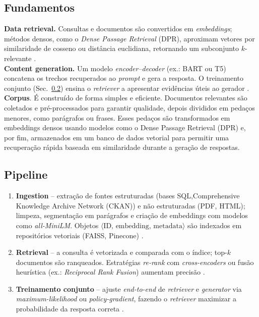 \begin{description}
\subsection{Fundamentos}
\textbf{Data retrieval.} Consultas e documentos são convertidos em
\emph{embeddings}; métodos densos, como o \textit{Dense Passage Retrieval}
(DPR), aproximam vetores por similaridade de cosseno ou distância euclidiana,
retornando um subconjunto $k$-relevante
\cite{lewis2020rag,taipalus2024vector,mageirakos2025cracking}.\\
\textbf{Content generation.} Um modelo \emph{encoder--decoder} (ex.: BART ou
T5) concatena os trechos recuperados ao \textit{prompt} e gera a resposta. O
treinamento conjunto (Sec.~\ref{sec:rag:pipeline}) ensina o \textit{retriever}
a apresentar evidências úteis ao gerador
\cite{aquino2024extracting,belarmino2025aplicacao}.\\
\textbf{Corpus}. É construído de forma simples e eficiente. Documentos relevantes são coletados e pré-processados para garantir qualidade, depois divididos em pedaços menores, como parágrafos ou frases. Esses pedaços são transformados em embeddings densos usando modelos como o Dense Passage Retrieval (DPR) e, por fim, armazenados em um banco de dados vetorial para permitir uma recuperação rápida baseada em similaridade durante a geração de respostas\cite{corpusRAG, lewis2020rag}.

 

\subsection{Pipeline}
\label{sec:rag:pipeline}
\begin{enumerate}[label=\arabic*.]
  \item \textbf{Ingestion} – extração de fontes estruturadas (bases SQL,Comprehensive Knowledge Archive Network (CKAN))
        e não estruturadas (PDF, HTML); limpeza, segmentação em parágrafos e
        criação de embeddings com modelos como \textit{all-MiniLM}.
        Objetos $\langle\text{ID},\,\text{embedding},\,\text{metadata}\rangle$
        são indexados em repositórios vetoriais (FAISS, Pinecone)
        \cite{qwak2024integrating,taipalus2024vector}.
  \item \textbf{Retrieval} – a consulta é vetorizada e comparada com o índice;
        top-$k$ documentos são ranqueados. Estratégias \emph{re-rank} com
        \textit{cross-encoders} ou fusão heurística (ex.: \textit{Reciprocal
        Rank Fusion}) aumentam precisão \cite{edwards2024hybrid}.
  \item \textbf{Treinamento conjunto} – ajuste \textit{end-to-end} de
        \textit{retriever} e \textit{generator} via
        \textit{maximum-likelihood} ou \textit{policy-gradient}, fazendo o
        \textit{retriever} maximizar a probabilidade da resposta correta
        \cite{zhang2025fine}.
\end{enumerate}


\end{description}
